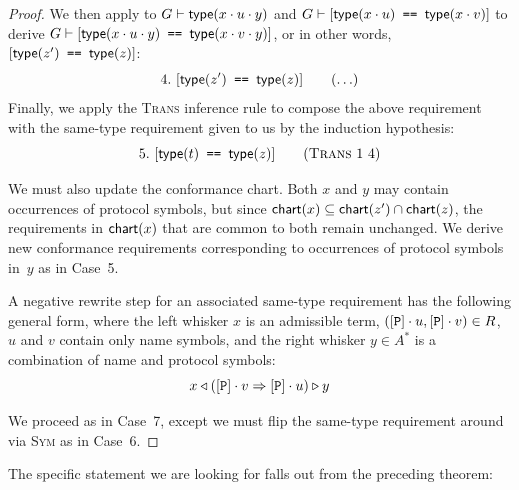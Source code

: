 \documentclass[../generics]{subfiles}
\begin{document}
\begin{proof}
We then apply  to $G\vdash\texttt{$\mathsf{type}(x\cdot u\cdot y)$}$ and $G\vdash[\texttt{$\mathsf{type}(x\cdot u)$ == $\mathsf{type}(x\cdot v)$}]$ to derive $G\vdash[\texttt{$\mathsf{type}(x\cdot u\cdot y)$ == $\mathsf{type}(x\cdot v\cdot y)$}]$, or in other words, $[\texttt{$\mathsf{type}(z')$ == $\mathsf{type}(z)$}]$:
\[
\AnyStep{\SameReq{$\Type(z')$}{$\Type(z)$}}{4}
\]
Finally, we apply the \textsc{Trans} inference rule to compose the above requirement with the same-type requirement given to us by the induction hypothesis:
\[
\TransStep{1}{4}{$\Type(t)$}{$\Type(z)$}{5}
\]

We must also update the conformance chart. Both $x$ and $y$ may contain occurrences of protocol symbols, but since $\mathsf{chart}(x)\subseteq\mathsf{chart}(z')\cap\mathsf{chart}(z)$, the requirements in $\mathsf{chart}(x)$ that are common to both remain unchanged. We derive new conformance requirements corresponding to occurrences of protocol symbols in~$y$ as in Case~5.

 A negative rewrite step for an associated same-type requirement has the following general form, where the left whisker $x$ is an admissible term, $([\texttt{P}]\cdot u,[\texttt{P}]\cdot v)\in R$, $u$ and $v$ contain only name symbols, and
the right whisker $y\in A^*$ is a combination of name and protocol symbols:
\[x\triangleleft([\texttt{P}]\cdot v\Rightarrow[\texttt{P}]\cdot u)\triangleright y\]

We proceed as in Case~7, except we must flip the same-type requirement around via \textsc{Sym} as in Case~6.
\end{proof}

The specific statement we are looking for falls out from the preceding theorem:
\end{document}
